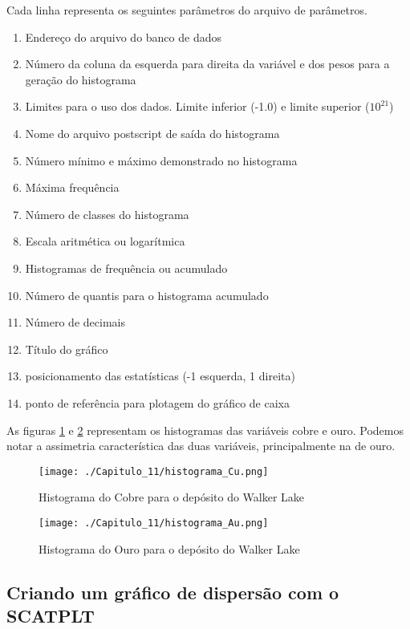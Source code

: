  Cada linha representa os seguintes parâmetros do arquivo de parâmetros.
 
\FloatBarrier 
\begin{enumerate}
	\item Endereço do arquivo do banco de dados 
	\item Número da coluna da esquerda para direita da variável e dos pesos para a geração do histograma 
	\item Limites para o uso dos dados. Limite inferior (-1.0) e limite superior ($10 ^{21} $)
	\item Nome do arquivo postscript de saída do histograma 
	\item Número mínimo e máximo demonstrado no histograma 
	\item Máxima frequência 
	\item Número de classes do histograma 
	\item Escala aritmética ou logarítmica 
	\item Histogramas de frequência ou acumulado 
	\item Número de quantis para o histograma acumulado 
	\item Número de decimais 
	\item Título do gráfico 
	\item posicionamento das estatísticas (-1 esquerda, 1 direita)
	\item ponto de referência para plotagem do gráfico de caixa 
\end{enumerate}
\FloatBarrier 


As figuras \ref{hist_walk_Cu_GSLIB} e \ref{hist_walk_Au_GSLIB} representam os histogramas das variáveis cobre e ouro. Podemos notar a assimetria característica das duas variáveis, principalmente na de ouro.

\FloatBarrier
\begin{figure}[h]
	\centering
	\texttt{[image: ./Capitulo\_11/histograma\_Cu.png]}	
	\caption{ Histograma do Cobre para o depósito do Walker Lake}
	\label{hist_walk_Cu_GSLIB}
\end{figure}
\FloatBarrier


\FloatBarrier
\begin{figure}[h]
	\centering
	\texttt{[image: ./Capitulo\_11/histograma\_Au.png]}	
	\caption{ Histograma do Ouro para o depósito do Walker Lake}
	\label{hist_walk_Au_GSLIB}
\end{figure}
\FloatBarrier

\subsection{Criando um gráfico de dispersão com o SCATPLT}

